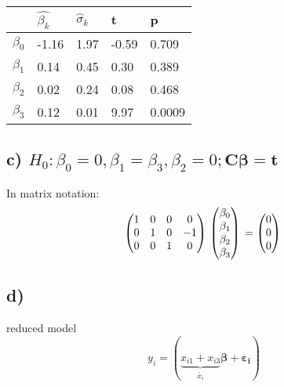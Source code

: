 \documentclass[]{article}
\begin{document}
\begin{longtable}[c]{@{}lllll@{}}
\toprule
& \(\hat{\beta_k}\) & \(\hat{\sigma}_k\) & t & p\tabularnewline
\midrule
\endhead
\(\beta_0\) & -1.16 & 1.97 & -0.59 & 0.709\tabularnewline
\(\beta_1\) & 0.14 & 0.45 & 0.30 & 0.389\tabularnewline
\(\beta_2\) & 0.02 & 0.24 & 0.08 & 0.468\tabularnewline
\(\beta_3\) & 0.12 & 0.01 & 9.97 & 0.0009\tabularnewline
\bottomrule
\end{longtable}

\subsection{\texorpdfstring{c)
\(H_0: \beta_0 = 0, \beta_1 = \beta_3, \beta_2 = 0; \mathbf{C} \boldsymbol{\beta} = \mathbf{t}\)}{c) H\_0: \textbackslash{}beta\_0 = 0, \textbackslash{}beta\_1 = \textbackslash{}beta\_3, \textbackslash{}beta\_2 = 0; \textbackslash{}mathbf\{C\} \textbackslash{}boldsymbol\{\textbackslash{}beta\} = \textbackslash{}mathbf\{t\}}}\label{c-hux5f0-betaux5f0-0-betaux5f1-betaux5f3-betaux5f2-0-mathbfc-boldsymbolbeta-mathbft}

In matrix notation: \[
\begin{pmatrix}
1 & 0 & 0 & 0\\
0 & 1 & 0 & -1\\
0 & 0 & 1 & 0\\
\end{pmatrix}\\
\begin{pmatrix}
\beta_0\\
\beta_1\\
\beta_2\\
\beta_3\\
\end{pmatrix}\\
=
\begin{pmatrix}
0\\
0\\
0\\
\end{pmatrix}\\
\]

\subsection{d)}\label{d}

reduced model
\[ y_i = (\underbrace{x_{i1} + x_{i3}}_{\tilde{x_i}} \boldsymbol{\beta}+\boldsymbol{\varepsilon_i}) \]
\end{document}
